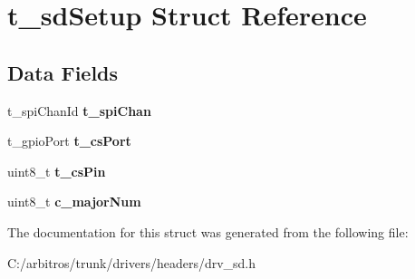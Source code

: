 \hypertarget{structt__sd_setup}{\section{t\-\_\-sd\-Setup Struct Reference}
\label{structt__sd_setup}
}
\subsection*{Data Fields}
\begin{DoxyCompactItemize}
\item 
\hypertarget{structt__sd_setup_a4d47f9a377243da04dabde77ed2bc169}{t\-\_\-spi\-Chan\-Id {\bfseries t\-\_\-spi\-Chan}}\label{structt__sd_setup_a4d47f9a377243da04dabde77ed2bc169}

\item 
\hypertarget{structt__sd_setup_a3d87083c0b55835fba9ce5adede49eb5}{t\-\_\-gpio\-Port {\bfseries t\-\_\-cs\-Port}}\label{structt__sd_setup_a3d87083c0b55835fba9ce5adede49eb5}

\item 
\hypertarget{structt__sd_setup_aef36163ab80e3e8b6361a7aad224fd6b}{uint8\-\_\-t {\bfseries t\-\_\-cs\-Pin}}\label{structt__sd_setup_aef36163ab80e3e8b6361a7aad224fd6b}

\item 
\hypertarget{structt__sd_setup_afba9106eb2fa769623759a1b529f884e}{uint8\-\_\-t {\bfseries c\-\_\-major\-Num}}\label{structt__sd_setup_afba9106eb2fa769623759a1b529f884e}

\end{DoxyCompactItemize}


The documentation for this struct was generated from the following file\-:\begin{DoxyCompactItemize}
\item 
C\-:/arbitros/trunk/drivers/headers/drv\-\_\-sd.\-h\end{DoxyCompactItemize}
